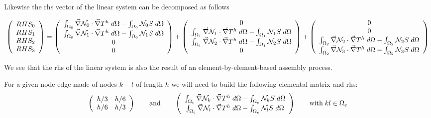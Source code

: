 Likewise the rhs vector of the linear system can be decomposed as follows
\begin{small}
\[
\left(
\begin{array}{c}
RHS_0 \\ RHS_1 \\ RHS_2 \\ RHS_3
\end{array}
\right)
=
\left(
\begin{array}{c}
\int_{\Omega_0} \vec\nabla {\mathcal{N}}_0 \cdot \vec\nabla T^h \; d\Omega - \int_{\Omega_0} {\mathcal{N}}_0 S \; d\Omega \\
\int_{\Omega_0} \vec\nabla {\mathcal{N}}_1 \cdot \vec\nabla T^h \; d\Omega - \int_{\Omega_0} {\mathcal{N}}_1 S \; d\Omega \\
0 \\ 0
\end{array}
\right)
+
\left(
\begin{array}{c}
0 \\
\int_{\Omega_1} \vec\nabla {\mathcal{N}}_1 \cdot \vec\nabla T^h \; d\Omega - \int_{\Omega_1} {\mathcal{N}}_1 S \; d\Omega \\
\int_{\Omega_1} \vec\nabla {\mathcal{N}}_2 \cdot \vec\nabla T^h \; d\Omega - \int_{\Omega_1} {\mathcal{N}}_2 S \; d\Omega \\
0
\end{array}
\right)
+
\left(
\begin{array}{c}
0 \\ 0 \\
\int_{\Omega_2} \vec\nabla {\mathcal{N}}_2 \cdot \vec\nabla T^h \; d\Omega - \int_{\Omega_2} {\mathcal{N}}_2 S \; d\Omega\\
\int_{\Omega_2} \vec\nabla {\mathcal{N}}_3 \cdot \vec\nabla T^h \; d\Omega - \int_{\Omega_2} {\mathcal{N}}_3 S \; d\Omega
\end{array}
\right)
\]

\end{small}
We see that the rhs of the linear system is also the result of an element-by-element-based assembly process.


For a given node edge made of nodes $k-l$ of length $h$ we will need to build
the following elemental matrix and rhs:
\[
\left(
\begin{array}{cc}
h/3 & h/6  \\
h/6 & h/3 
\end{array}
\right)
\qquad
\text{and}
\qquad
\left(
\begin{array}{c}
\int_{\Omega_e} \vec\nabla {\mathcal{N}}_k \cdot \vec\nabla T^h \; d\Omega - \int_{\Omega_e} {\mathcal{N}}_k S \; d\Omega \\
\int_{\Omega_e} \vec\nabla {\mathcal{N}}_l \cdot \vec\nabla T^h \; d\Omega - \int_{\Omega_e} {\mathcal{N}}_l S \; d\Omega 
\end{array}
\right)
\qquad
\text{with} \; kl \in \Omega_e
\]

